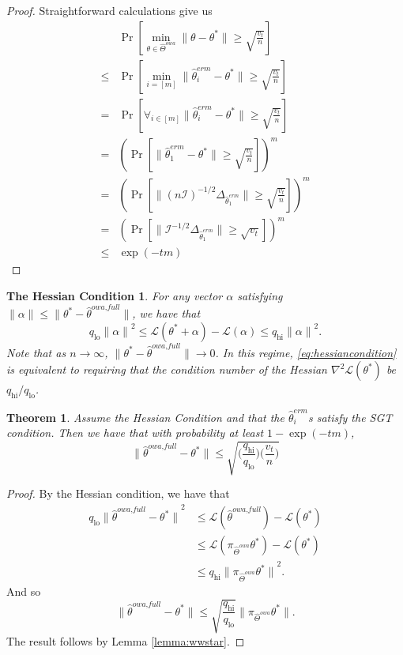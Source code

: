 \documentclass[twoside]{article}
\newtheorem{theorem}{Theorem}
\newcommand{\qhi}{q_\text{hi}}
\newcommand{\qlo}{q_\text{lo}}
\newcommand{\Wowa}{{\hat \Theta^{\textit{owa}}}}
\newcommand{\w}{\theta}
\newcommand{\wowafull}{\hat\w^{\textit{owa,full}}}
\newcommand{\wmle}{\hat\w^{erm}}
\newcommand{\wstar}{{\w^{*}}}
\newcommand{\Loss}{\mathcal{L}}
\newcommand{\I}{\mathcal I}
\newcommand{\ltwo}[1]{{\lVert {#1} \rVert}}
\newcommand{\proj}[1]{\pi_{{#1}}}
\newcommand{\prob}[1]{\Pr\left[{#1}\right]}
\begin{document}
\begin{proof}
Straightforward calculations give us
\begin{align}
&\prob{\min_{\w\in\Wowa} \ltwo{\w-\wstar} \ge \sqrt{\frac{v_t}{n}}} 
\\
\le &
\prob{\min_{i=[m]} \ltwo{\wmle_i-\wstar} \ge \sqrt{\frac{v_t}{n}}}
\\
= &
\prob{\forall_{i\in[m]} \ltwo{\wmle_i-\wstar} \ge \sqrt{\frac{v_t}{n}}} 
\\
= &
\left(\prob{\ltwo{\wmle_1-\wstar} \ge \sqrt{\frac{v_t}{n}}} \right)^m
\\
= &
\left(
\prob{\ltwo{(n\I)^{-1/2}\Delta_{\wmle_1}} \ge \sqrt{\frac{v_t}{n}} }
\right)^m
\\
= &
\left(
\prob{\ltwo{\I^{-1/2}\Delta_{\wmle_1}} \ge \sqrt{v_t} }
\right)^m
\\
\le &
\exp(-tm)
\end{align}
\end{proof}

\newtheorem*{cont}{The Hessian Condition}
\begin{cont}
For any vector $\alpha$ satisfying $\ltwo{\alpha}\le\ltwo{\wstar-\wowafull}$, we have that
\begin{equation}
\label{eq:hessiancondition}
\qlo\ltwo{\alpha}^2 \le \Loss(\wstar+\alpha) - \Loss(\alpha) \le \qhi\ltwo{\alpha}^2
.
\end{equation}
Note that as $n\to\infty$, $\ltwo{\wstar-\wowafull}\to0$.
In this regime,  \eqref{eq:hessiancondition} is equivalent to requiring that the condition number of the Hessian $\nabla^2\Loss(\wstar)$ be $\qhi/\qlo$.
\end{cont}

\begin{theorem}
\label{theorem:wowafull}
Assume the Hessian Condition and that the $\wmle_i$s satisfy the SGT condition.
Then we have that with probability at least $1-\exp(-tm)$, 
\begin{equation}
\ltwo{\wowafull-\wstar} \le \sqrt{\bigg(\frac{\qhi}{\qlo}\bigg)\bigg(\frac{v_t}{n}\bigg)}
\end{equation}
\end{theorem}

\begin{proof}
By the Hessian condition, we have that
\begin{align}
\qlo\ltwo{\wowafull-\wstar}^2
&\le
\Loss(\wowafull) - \Loss(\wstar)
\\
&\le
\Loss(\proj{\Wowa}\wstar) - \Loss(\wstar)
\\
&\le
\qhi\ltwo{\proj{\Wowa}\wstar}^2
.
\end{align}
And so
\begin{equation}
\ltwo{\wowafull-\wstar} \le \sqrt{\frac{\qhi}{\qlo}}\ltwo{\proj{\Wowa}\wstar}
.
\end{equation}
The result follows by Lemma \ref{lemma:wwstar}.
\end{proof}
\end{document}
